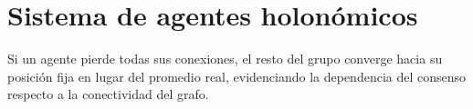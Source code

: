 \section{Sistema de agentes holonómicos}
Si un agente pierde todas sus conexiones, el resto del grupo converge hacia su posición fija en lugar del promedio real, evidenciando la dependencia del consenso respecto a la conectividad del grafo.

